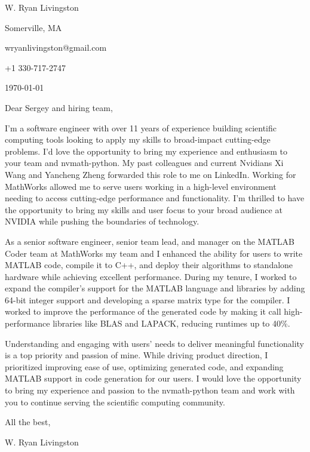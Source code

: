 \documentclass[
    10pt %
]{article}
\begin{document}
\begin{minipage}{\linewidth}
W. Ryan Livingston

Somerville, MA

wryanlivingston@gmail.com

+1 330-717-2747

\today
\end{minipage}

Dear Sergey and hiring team,

I'm a software engineer with over 11 years of experience building scientific computing tools looking to apply my skills to broad-impact cutting-edge problems. I'd love the opportunity to bring my experience and enthusiasm to your team and nvmath-python.
My past colleagues and current Nvidians Xi Wang and Yancheng Zheng forwarded this role to me on LinkedIn. Working for MathWorks allowed me to serve users working in a high-level environment needing to access cutting-edge performance and functionality. I'm thrilled to have the opportunity to bring my skills and user focus to your broad audience at NVIDIA while pushing the boundaries of technology.

As a senior software engineer, senior team lead, and manager on the MATLAB Coder team at MathWorks my team and I enhanced the ability for users to write MATLAB code, compile it to C++, and deploy their algorithms to standalone hardware while achieving excellent performance. During my tenure, I worked to expand the compiler's support for the MATLAB language and libraries by adding 64-bit integer support and developing a sparse matrix type for the compiler. I worked to improve the performance of the generated code by making it call high-performance libraries like BLAS and LAPACK, reducing runtimes up to 40\%.

Understanding and engaging with users' needs to deliver meaningful functionality is a top priority and passion of mine. While driving product direction, I prioritized improving ease of use, optimizing generated code, and expanding MATLAB support in code generation for our users. I would love the opportunity to bring my experience and passion to the nvmath-python team and work with you to continue serving the scientific computing community.

All the best,

W. Ryan Livingston
\end{document}
